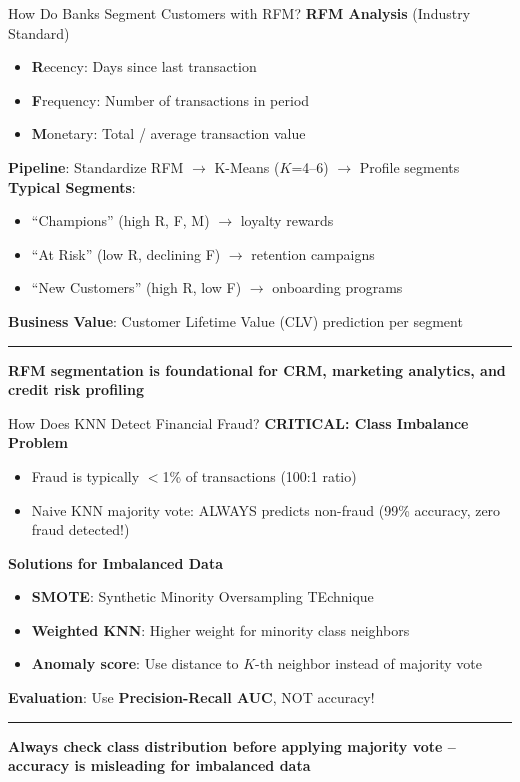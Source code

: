 \documentclass[8pt,aspectratio=169]{beamer}
\newcommand{\bottomnote}[1]{%
\vfill
\vspace{-2mm}
\textcolor{mllavender2}{\rule{\textwidth}{0.4pt}}
\vspace{1mm}
\footnotesize
\textbf{#1}
}
\begin{document}
\begin{frame}[t]{How Do Banks Segment Customers with RFM?}
\textbf{RFM Analysis} (Industry Standard)
\begin{itemize}
\item \textbf{R}ecency: Days since last transaction
\item \textbf{F}requency: Number of transactions in period
\item \textbf{M}onetary: Total / average transaction value
\end{itemize}
\vspace{0.3em}
\textbf{Pipeline}: Standardize RFM $\to$ K-Means ($K$=4--6) $\to$ Profile segments
\vspace{0.3em}
\textbf{Typical Segments}:
\begin{itemize}
\item ``Champions'' (high R, F, M) $\to$ loyalty rewards
\item ``At Risk'' (low R, declining F) $\to$ retention campaigns
\item ``New Customers'' (high R, low F) $\to$ onboarding programs
\end{itemize}
\vspace{0.3em}
\textbf{Business Value}: Customer Lifetime Value (CLV) prediction per segment
\bottomnote{RFM segmentation is foundational for CRM, marketing analytics, and credit risk profiling}
\end{frame}

\begin{frame}[t]{How Does KNN Detect Financial Fraud?}
\textbf{CRITICAL: Class Imbalance Problem}
\begin{itemize}
\item Fraud is typically $<$1\% of transactions (100:1 ratio)
\item Naive KNN majority vote: ALWAYS predicts non-fraud (99\% accuracy, zero fraud detected!)
\end{itemize}
\vspace{0.5em}
\textbf{Solutions for Imbalanced Data}
\begin{itemize}
\item \textbf{SMOTE}: Synthetic Minority Oversampling TEchnique
\item \textbf{Weighted KNN}: Higher weight for minority class neighbors
\item \textbf{Anomaly score}: Use distance to $K$-th neighbor instead of majority vote
\end{itemize}
\vspace{0.3em}
\textbf{Evaluation}: Use \textbf{Precision-Recall AUC}, NOT accuracy!
\bottomnote{Always check class distribution before applying majority vote -- accuracy is misleading for imbalanced data}
\end{frame}
\end{document}
